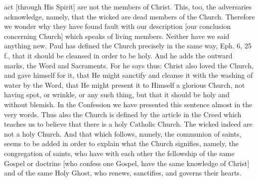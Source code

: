 act [through His Spirit] are not the members of Christ.  This, too,
the adversaries acknowledge, namely, that the wicked are dead members
of the Church.  Therefore we wonder why they have found fault with
our description [our conclusion concerning Church] which speaks of
living members.  Neither have we said anything new.  Paul has defined
the Church precisely in the same way, Eph. 6, 25 f., that it should
be cleansed in order to be holy.  And he adds the outward marks, the
Word and Sacraments.  For he says thus: Christ also loved the Church,
and gave himself for it, that He might sanctify and cleanse it with
the washing of water by the Word, that He might present it to Himself
a glorious Church, not having spot, or wrinkle, or any such thing,
but that it should be holy and without blemish.  In the Confession we
have presented this sentence almost in the very words.  Thus also the
Church is defined by the article in the Creed which teaches us to
believe that there is a holy Catholic Church.  The wicked indeed are
not a holy Church.  And that which follows, namely, the communion of
saints, seems to be added in order to explain what the Church
signifies, namely, the congregation of saints, who have with each
other the fellowship of the same Gospel or doctrine [who confess one
Gospel, have the same knowledge of Christ] and of the same Holy Ghost,
who renews, sanctifies, and governs their hearts.

